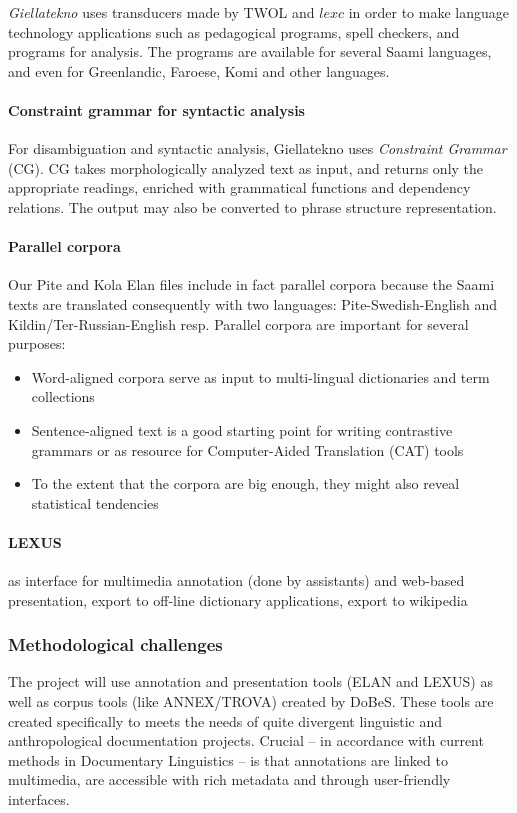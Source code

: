 \documentclass[a4paper,12pt]{article}
\begin{document}
\textit{Giellatekno} uses transducers made by TWOL and $lexc$ in order to make language technology applications such as pedagogical programs, spell checkers, and programs for analysis. The programs are available for several Saami languages, and even for Greenlandic, Faroese, Komi and other languages.

\paragraph{Constraint grammar for syntactic analysis}
For disambiguation and syntactic analysis, Giellatekno uses \textit{Constraint Grammar} (CG). CG takes morphologically analyzed text as input, and returns only the appropriate readings, enriched with grammatical functions and dependency relations. The output may also be converted to phrase structure representation.

\paragraph{Parallel corpora}
Our Pite and Kola Elan files include in fact parallel corpora because the Saami texts are translated consequently with two languages: Pite-Swedish-English and Kildin/Ter-Russian-English resp. Parallel corpora are important for several purposes:
\begin{itemize}
\item Word-aligned corpora serve as input to multi-lingual dictionaries and term collections
\item Sentence-aligned text is a good starting point for writing contrastive grammars or as resource for
Computer-Aided Translation (CAT) tools 
\item To the extent that the corpora are big enough, they might also reveal statistical tendencies
\end{itemize}

\paragraph{LEXUS} as interface for multimedia annotation (done by assistants) and web-based presentation, export to off-line dictionary applications, export to wikipedia

\subsubsection{Methodological challenges}%
The project will use annotation and presentation tools (ELAN and LEXUS) as well as corpus tools (like ANNEX/TROVA) created by DoBeS. These tools are created specifically to meets the needs of quite divergent linguistic and anthropological documentation projects. Crucial – in accordance with current methods in Documentary Linguistics – is that annotations are linked to multimedia, are accessible with rich metadata and through user-friendly interfaces.
\end{document}
